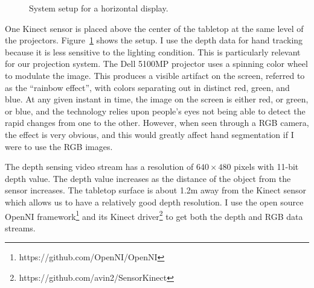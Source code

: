 \begin{figure}[tbh]
  \centering
  \caption{System setup for a horizontal display.} 
  \label{fig:setup}
\end{figure}

One Kinect sensor is placed above the center of the tabletop
at the same level of the projectors. Figure~\ref{fig:setup} shows the setup.
I use the depth data for hand tracking because it is
less sensitive to the lighting condition. This is particularly relevant for our
projection system. The Dell 5100MP projector uses a spinning color wheel to
modulate the image. This produces a visible artifact on the screen, referred to 
as the ``rainbow effect'', with colors separating out in distinct red, green, 
and blue. At any given instant in time, the image on the screen is either red, or green, or blue,
and the technology relies upon people's eyes not being able to detect the rapid 
changes from one to the other. However, when seen through a RGB camera, the
effect is very obvious, and this would greatly affect hand segmentation if I
were to use the RGB images. 

The depth sensing video
stream has a resolution of $640\times 480$ pixels with 11-bit depth value. The
depth value increases as the distance of the object from the sensor increases.
The tabletop surface is about 1.2m away from the Kinect
sensor which allows us to have a relatively good depth resolution. I use the
open source OpenNI framework\footnote{https://github.com/OpenNI/OpenNI} and its
Kinect driver\footnote{https://github.com/avin2/SensorKinect} to get both the depth and RGB data streams.


